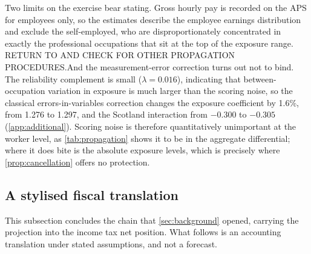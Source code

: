 Two limits on the exercise bear stating. Gross hourly pay is recorded on the APS for employees only, so the estimates describe the employee earnings distribution and exclude the self-employed, who are disproportionately concentrated in exactly the professional occupations that sit at the top of the exposure range. RETURN TO AND CHECK FOR OTHER PROPAGATION PROCEDURES.And the measurement-error correction turns out not to bind. The reliability complement is small ($\lambda = 0.016$), indicating that between-occupation variation in exposure is much larger than the scoring noise, so the classical errors-in-variables correction changes the exposure coefficient by 1.6\%, from 1.276 to 1.297, and the Scotland interaction from $-0.300$ to $-0.305$ (\cref{app:additional}). Scoring noise is therefore quantitatively unimportant at the worker level, as \cref{tab:propagation} shows it to be in the aggregate differential; where it does bite is the absolute exposure levels, which is precisely where \cref{prop:cancellation} offers no protection.

\subsection{A stylised fiscal translation}\label{sec:fiscal}

This subsection concludes the chain that \cref{sec:background} opened, carrying the projection into the income tax net position. What follows is an accounting translation under stated assumptions, and not a forecast.

